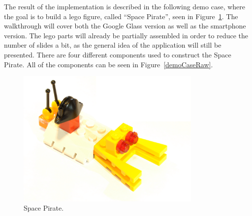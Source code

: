 The result of the implementation is described in the following demo case, where the goal is to build a lego figure, called ``Space Pirate'', seen in Figure~\ref{demoCaseGoal}. The walkthrough will cover both the Google Glass version as well as the smartphone version. The lego parts will already be partially assembled in order to reduce the number of slides a bit, as the general idea of the application will still be presented. There are four different components used to construct the Space Pirate. All of the components can be seen in Figure~\ref{demoCaseRaw}.

	\begin{figure}[ht!]
		\centering
		\includegraphics[width=90mm]{images/rawImages/BILD_6}
		\caption{Space Pirate.}
		\label{demoCaseGoal}
	\end{figure}

